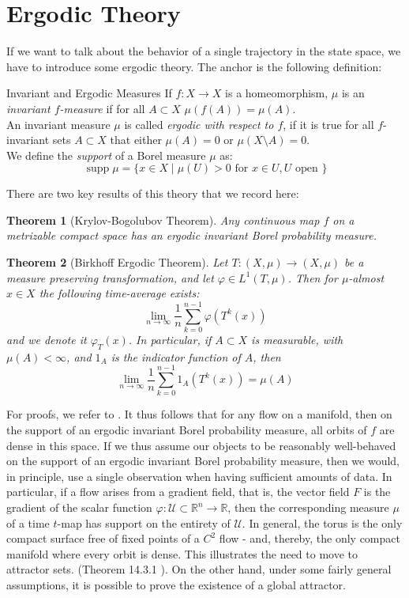 \documentclass[11pt, a4paper]{memoir}
\theoremstyle{break}
\newtheorem{thm}{Theorem}
\theoremstyle{break}
\theoremstyle{nonumberplain}
\newcommand{\mR}{\mathbb{R}}
\DeclareMathOperator{\supp}{supp}
\begin{document}
\section{Ergodic Theory}
If we want to talk about the behavior of a single trajectory in the state space, we have to introduce some ergodic theory. The anchor is the following definition:
\begin{mydefinition}{Invariant and Ergodic Measures}
If $f:X\to X$ is a homeomorphism, $\mu$ is an \emph{invariant $f$-measure} if for all $A\subset X$ $\mu(f(A))=\mu(A)$.\\[5pt]
An invariant measure $\mu$ is called \emph{ergodic with respect to $f$}, if it is true for all $f$-invariant sets $A\subset X$ that either $\mu(A)=0$ or $\mu(X\setminus A)=0$.\\[5pt]
We define the \emph{support} of a Borel measure $\mu$ as:
$$\supp \mu=\{x\in X\mid \mu(U)>0 \text{ for } x\in U, U \text{ open }\}$$
\end{mydefinition}
There are two key results of this theory that we record here:
\begin{thm}[Krylov-Bogolubov Theorem]
Any continuous map $f$ on a metrizable compact space has an ergodic invariant Borel probability measure.
\end{thm}
\begin{thm}[Birkhoff Ergodic Theorem]
Let $T:(X,\mu)\to (X,\mu)$ be a measure preserving transformation, and let $\varphi\in L^1(T,\mu)$. Then for $\mu$-almost $x\in X$ the following time-average exists:
$$\lim_{n\to\infty}\frac{1}{n}\sum_{k=0}^{n-1}\varphi(T^k(x))$$
and we denote it $\varphi_T(x)$. In particular, if $A\subset X$ is measurable, with $\mu(A)<\infty$, and $1_A$ is the indicator function of $A$, then
$$\lim_{n\to\infty}\frac{1}{n}\sum_{k=0}^{n-1}1_A(T^k(x))=\mu(A)$$
\end{thm}
For proofs, we refer to \cite{Katok}. It thus follows that for any flow on a manifold, then on the support of an ergodic invariant Borel probability measure, all orbits of $f$ are dense in this space. If we thus assume our objects to be reasonably well-behaved on the support of an ergodic invariant Borel probability measure, then we would, in principle, use a single observation when having sufficient amounts of data. In particular, if a flow arises from a gradient field, that is, the vector field $F$ is the gradient of the scalar function $\varphi: \mathcal{U}\subset \mR^n\to \mR$, then the corresponding measure $\mu$ of a time $t$-map has support on the entirety of $\mathcal{U}$. In general, the torus is the only compact surface free of fixed points of a $C^2$ flow - and, thereby, the only compact manifold where every orbit is dense. This illustrates the need to move to attractor sets. (Theorem 14.3.1 \cite{Katok}). On the other hand, under some fairly general assumptions, it is possible to prove the existence of a global attractor.
\end{document}
